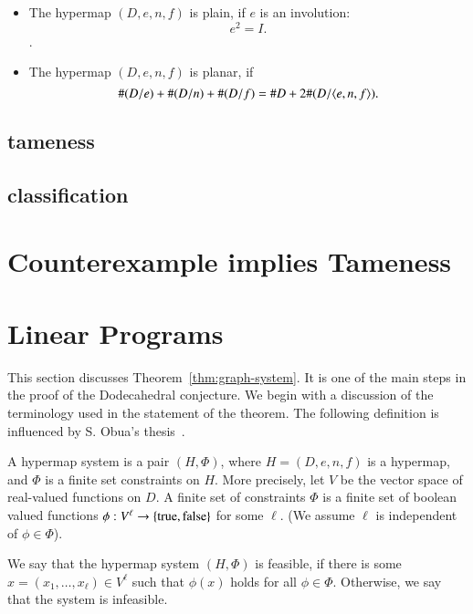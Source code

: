 \begin{definition}\label{def:plain}

\begin{itemize}
\item The hypermap $(D,e,n,f)$ is plain, if $e$ is an involution:
$$
 e^2 = I.
$$.
\item The hypermap $(D,e,n,f)$ is planar, if
   $$
   \#(D/e) + \#(D/n) + \#(D/f) = \# D + 2\#(D/\langle e,n,f\rangle).
   $$
\end{itemize}
\end{definition}

\subsection{tameness}

\subsection{classification}


\section{Counterexample implies Tameness}

\section{Linear Programs}

This section discusses Theorem~\ref{thm:graph-system}.  It is one of
the main steps in the proof of the Dodecahedral conjecture.
We begin with a discussion of the terminology used in the
statement of the theorem.
The following definition is influenced by S. Obua's thesis~\cite{Ob}.

\begin{definition} A hypermap system is a pair $(H,\Phi)$,
where $H=(D,e,n,f)$ is a hypermap, and $\Phi$ is a finite set constraints on $H$.  More precisely, let $V$ be the vector space of
real-valued functions on $D$.  A finite set of constraints $\Phi$ is a finite
set of boolean valued functions $\phi:V^\ell\to \{{\operatorname{true}},{\operatorname{false}}\}$
for some $\ell$. (We assume $\ell$ is independent of $\phi\in \Phi$).
\end{definition}

We say that the hypermap system $(H,\Phi)$ is feasible, if
there is some $x=(x_1,\ldots,x_\ell)\in V^\ell$ such that
$\phi(x)$ holds for all $\phi\in\Phi$. Otherwise, we say that
the system is infeasible.

